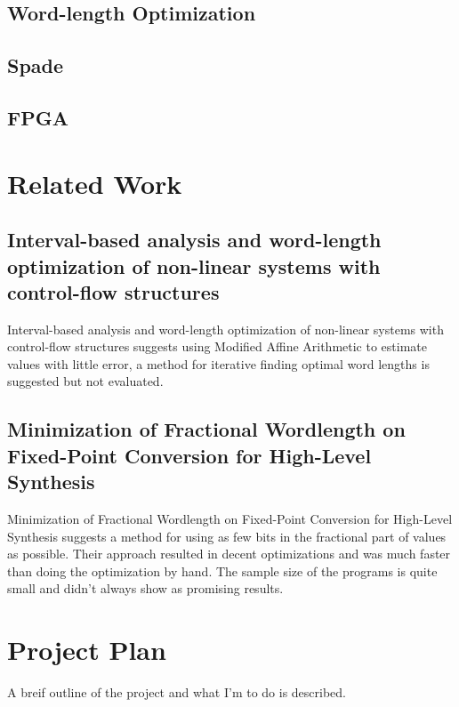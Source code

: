 \documentclass[msc,lith,english]{liuthesis}
\begin{document}
\section{Word-length Optimization}

\section{Spade}

\section{FPGA}

\chapter{Related Work}

\section{Interval-based analysis and word-length optimization of non-linear systems with control-flow structures}
Interval-based analysis and word-length optimization of non-linear systems with control-flow structures suggests using Modified Affine Arithmetic to estimate values with little error, a method for iterative finding optimal word lengths is suggested but not evaluated.

\cite{src:WlOpNLSystems}

\section{Minimization of Fractional Wordlength on Fixed-Point Conversion for High-Level Synthesis}
Minimization of Fractional Wordlength on Fixed-Point Conversion for High-Level Synthesis suggests a method for using as few bits in the fractional part of values as possible. Their approach resulted in decent optimizations and was much faster than doing the optimization by hand. The sample size of the programs is quite small and didn't always show as promising results.

\cite{src:MinOfFrac}

\chapter{Project Plan}
A breif outline of the project and what I'm to do is described.
\end{document}
